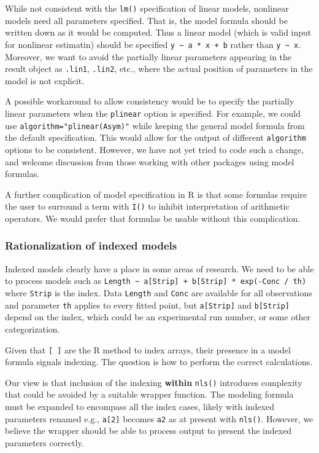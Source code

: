 \documentclass[
]{article}
\begin{document}
While not consistent with the \texttt{lm()} specification of linear
models, nonlinear models need all parameters specified. That is, the
model formula should be written down as it would be computed. Thus a
linear model (which is valid input for nonlinear estimatin) should be
specified \texttt{y\ \textasciitilde{}\ a\ *\ x\ +\ b} rather than
\texttt{y\ \textasciitilde{}\ x}. Moreover, we want to avoid the
partially linear parameters appearing in the result object as
\texttt{.lin1}, \texttt{.lin2}, etc., where the actual position of
parameters in the model is not explicit.

A possible workaround to allow consistency would be to specify the
partially linear parameters when the \texttt{plinear} option is
specified. For example, we could use \texttt{algorithm="plinear(Asym)"}
while keeping the general model formula from the default specification.
This would allow for the output of different \texttt{algorithm} options
to be consistent. However, we have not yet tried to code such a change,
and welcome discussion from those working with other packages using
model formulas.

A further complication of model specification in R is that some formulas
require the user to surround a term with \texttt{I()} to inhibit
interpretation of arithmetic operators. We would prefer that formulas be
usable without this complication.

\hypertarget{rationalization-of-indexed-models}{%
\subsubsection{Rationalization of indexed
models}\label{rationalization-of-indexed-models}}

Indexed models clearly have a place in some areas of research. We need
to be able to process models such as
\texttt{Length\ \textasciitilde{}\ a{[}Strip{]}\ +\ b{[}Strip{]}\ *\ exp(-Conc\ /\ th)}
where \texttt{Strip} is the index. Data \texttt{Length} and
\texttt{Conc} are available for all observations and parameter
\texttt{th} applies to every fitted point, but \texttt{a{[}Strip{]}} and
\texttt{b{[}Strip{]}} depend on the index, which could be an
experimental run number, or some other categorization.

Given that \texttt{{[}\ {]}} are the R method to index arrays, their
presence in a model formula signals indexing. The question is how to
perform the correct calculations.

Our view is that inclusion of the indexing \textbf{within}
\texttt{nls()} introduces complexity that could be avoided by a suitable
wrapper function. The modeling formula must be expanded to encompass all
the index cases, likely with indexed parameters renamed e.g.,
\texttt{a{[}2{]}} becomes \texttt{a2} as at present with \texttt{nls()}.
However, we believe the wrapper should be able to process output to
present the indexed parameters correctly.
\end{document}
